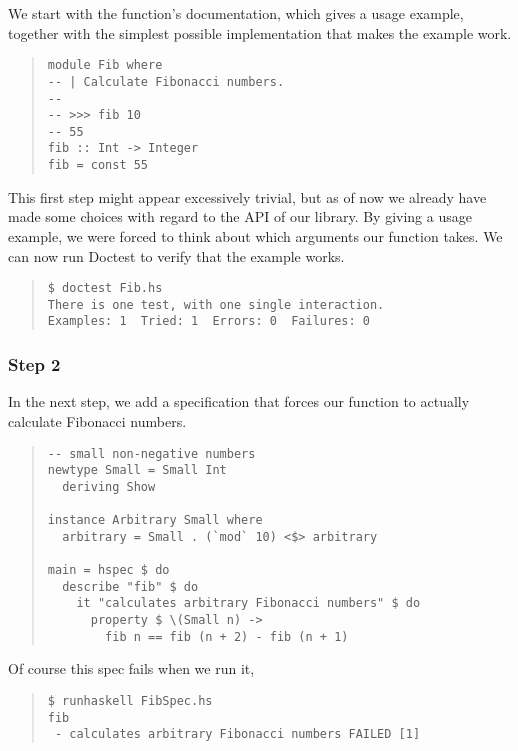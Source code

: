 \documentclass[preprint]{sigplanconf}
\begin{document}
We start with the function's documentation, which gives a usage
example, together with the simplest possible implementation that makes
the example work.

\begin{quote}
\small
\begin{verbatim}
module Fib where
-- | Calculate Fibonacci numbers.
--
-- >>> fib 10
-- 55
fib :: Int -> Integer
fib = const 55
\end{verbatim}
\end{quote}

\noindent This first step might appear excessively trivial, but as of now we
already have made some choices with regard to the API of our library.
By giving a usage example, we were forced to think about which
arguments our function takes.  We can now run Doctest to verify that
the example works.

\begin{quote}
\small
\begin{verbatim}
$ doctest Fib.hs
There is one test, with one single interaction.
Examples: 1  Tried: 1  Errors: 0  Failures: 0
\end{verbatim}
\end{quote}


\subsubsection{Step 2}

In the next step, we add a specification that forces our function to
actually calculate Fibonacci numbers.

\begin{quote}
\small
\begin{verbatim}
-- small non-negative numbers
newtype Small = Small Int
  deriving Show

instance Arbitrary Small where
  arbitrary = Small . (`mod` 10) <$> arbitrary

main = hspec $ do
  describe "fib" $ do
    it "calculates arbitrary Fibonacci numbers" $ do
      property $ \(Small n) ->
        fib n == fib (n + 2) - fib (n + 1)
\end{verbatim}
\end{quote}

\noindent Of course this spec fails when we run it,

\begin{quote}
\small
\begin{verbatim}
$ runhaskell FibSpec.hs
fib
 - calculates arbitrary Fibonacci numbers FAILED [1]
\end{verbatim}
\end{quote}
\end{document}

